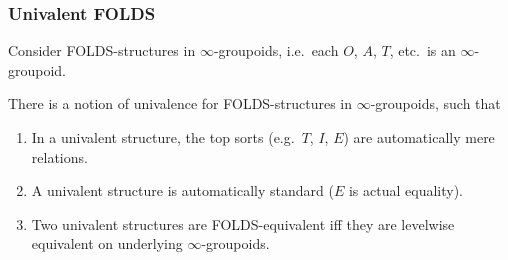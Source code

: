 \documentclass{beamer}
\begin{document}

\begin{frame}
  \frametitle{Univalent FOLDS}
  Consider FOLDS-structures in $\infty$-groupoids, i.e.\ each $O$, $A$, $T$, etc.\ is an $\infty$-groupoid.
  \begin{theorem}[in progress]
    There is a notion of \alert{univalence} for FOLDS-structures in $\infty$-groupoids, such that
    \begin{enumerate}
    \item In a univalent structure, the top sorts (e.g.\ $T$, $I$, $E$) are {automatically} mere relations.
    \item A univalent structure is automatically standard ($E$ is actual equality).
    \item Two univalent structures are FOLDS-equivalent iff they are levelwise equivalent on underlying $\infty$-groupoids.
    \end{enumerate}
  \end{theorem}
\end{frame}
\end{document}
